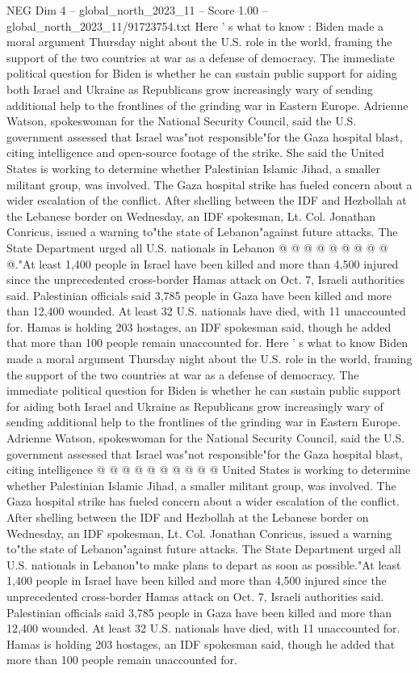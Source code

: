 \begin{textsample}{NEG Dim 4 – global\_north\_2023\_11 – Score 1.00 – global\_north\_2023\_11/91723754.txt}  \label{ex:f4_neg_190}
Here ' s what to know : Biden made a moral argument Thursday night about the U.S. role in the world, framing the support of the two countries at war as a defense of democracy.
The immediate political question for Biden is whether he can sustain public support for aiding both Israel and Ukraine as Republicans grow increasingly wary of sending additional help to the frontlines of the grinding war in Eastern Europe.
Adrienne Watson, spokeswoman for the National Security Council, said the U.S. government assessed that Israel was"not responsible"for the Gaza hospital blast, citing intelligence and open-source footage of the strike.
She said the United States is working to determine whether Palestinian Islamic Jihad, a smaller militant group, was involved.
The Gaza hospital strike has fueled concern about a wider escalation of the conflict.
After shelling between the IDF and Hezbollah at the Lebanese border on Wednesday, an IDF spokesman, Lt.
Col.
Jonathan Conricus, issued a warning to"the state of Lebanon"against future attacks.
The State Department urged all U.S. nationals in Lebanon @ @ @ @ @ @ @ @ @ @."At least 1,400 people in Israel have been killed and more than 4,500 injured since the unprecedented cross-border Hamas attack on Oct. 7, Israeli authorities said.
Palestinian officials said 3,785 people in Gaza have been killed and more than 12,400 wounded.
At least 32 U.S. nationals have died, with 11 unaccounted for.
Hamas is holding 203 hostages, an IDF spokesman said, though he added that more than 100 people remain unaccounted for.
Here ' s what to know Biden made a moral argument Thursday night about the U.S. role in the world, framing the support of the two countries at war as a defense of democracy.
The immediate political question for Biden is whether he can sustain public support for aiding both Israel and Ukraine as Republicans grow increasingly wary of sending additional help to the frontlines of the grinding war in Eastern Europe.
Adrienne Watson, spokeswoman for the National Security Council, said the U.S. government assessed that Israel was"not responsible"for the Gaza hospital blast, citing intelligence @ @ @ @ @ @ @ @ @ @ United States is working to determine whether Palestinian Islamic Jihad, a smaller militant group, was involved.
The Gaza hospital strike has fueled concern about a wider escalation of the conflict.
After shelling between the IDF and Hezbollah at the Lebanese border on Wednesday, an IDF spokesman, Lt.
Col.
Jonathan Conricus, issued a warning to"the state of Lebanon"against future attacks.
The State Department urged all U.S. nationals in Lebanon"to make plans to depart as soon as possible."At least 1,400 people in Israel have been killed and more than 4,500 injured since the unprecedented cross-border Hamas attack on Oct. 7, Israeli authorities said.
Palestinian officials said 3,785 people in Gaza have been killed and more than 12,400 wounded.
At least 32 U.S. nationals have died, with 11 unaccounted for.
Hamas is holding 203 hostages, an IDF spokesman said, though he added that more than 100 people remain unaccounted for.

\end{textsample}
